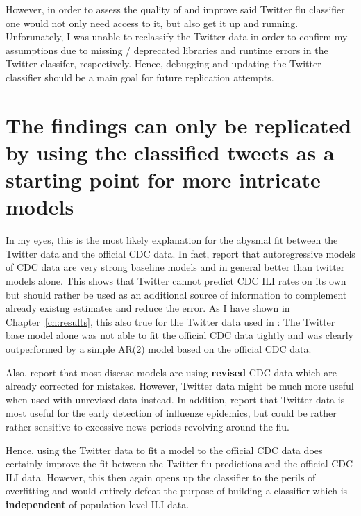 \documentclass[11pt, a4paper,twoside]{report}\usepackage[]{graphicx}\usepackage[]{color}
\begin{document}
However, in order to assess the quality of and improve said Twitter flu classifier one would not only need access to it, but also get it up and running. Unforunately, I was unable to reclassify the Twitter data in order to confirm my assumptions due to missing / deprecated libraries and runtime errors in the Twitter classifer, respectively. Hence, debugging and updating the Twitter classifier should be a main goal for future replication attempts.\newline

\section{The findings can only be replicated by using the classified tweets as a starting point for more intricate models}
In my eyes, this is the most likely explanation for the abysmal fit between the Twitter data and the official CDC data. In fact, \citep{paul_worldwide_2015} report that autoregressive models of CDC data are very strong baseline models and in general better than twitter models alone. This shows that Twitter cannot predict CDC ILI rates on its own but should rather be used as an additional source of information to complement already existng estimates and reduce the error. As I have shown in Chapter~\ref{ch:results}, this also true for the Twitter data used in \citep{bodnar_data_2015}: The Twitter base model alone was not able to fit the official CDC data tightly and was clearly outperformed by a simple AR(2) model based on the official CDC data. \newline

Also, \citep{paul_twitter_2014} report that most disease models are using \textbf{revised} CDC data which are already corrected for mistakes. However, Twitter data might be much more useful when used with unrevised data instead. In addition, \citep{aramaki_twitter_2011} report that Twitter data is most useful for the early detection of influenze epidemics, but could be rather rather sensitive to excessive news periods revolving around the flu.\newline

Hence, using the Twitter data to fit a model to the official CDC data does certainly improve the fit between the Twitter flu predictions and the official CDC ILI data. However, this then again opens up the classifier to the perils of overfitting and would entirely defeat the purpose of building a classifier which is \textbf{independent} of population-level ILI data. \newline
\end{document}
